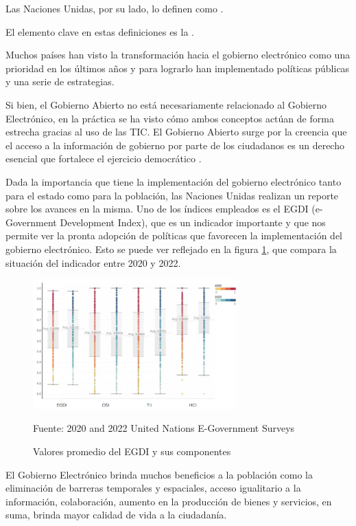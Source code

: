 Las Naciones Unidas, por su lado, lo definen como .

El elemento clave en estas definiciones es la .

Muchos países han visto la transformación hacia el gobierno electrónico como una prioridad en los últimos años y para lograrlo han implementado políticas públicas y una serie de estrategias.

Si bien, el Gobierno Abierto no está necesariamente relacionado al Gobierno Electrónico, en la práctica se ha visto cómo ambos conceptos actúan de forma estrecha gracias al uso de las TIC. El Gobierno Abierto surge por la creencia que el acceso a la información de gobierno por parte de los ciudadanos es un derecho esencial que fortalece el ejercicio democrático \cite[13]{naserGobiernoElectronicoGestion2011}.

Dada la importancia que tiene la implementación del gobierno electrónico tanto para el estado como para la población, las Naciones Unidas realizan un reporte sobre los avances en la misma. Uno de los índices empleados es el EGDI (e-Government Development Index), que es un indicador importante y que nos permite ver la pronta adopción de políticas que favorecen la implementación del gobierno electrónico. Esto se puede ver reflejado en la figura \ref{fig:egdi2020_2022}, que compara la situación del indicador entre 2020 y 2022.

\begin{figure}[!h]
    \centering
    \includegraphics[width=0.7\textwidth]{assets/egdi2020_2022}
    \caption{Valores promedio del EGDI y sus componentes}{Fuente: 2020 and 2022 United Nations E-Government Surveys}
    \label{fig:egdi2020_2022}
\end{figure}

El Gobierno Electrónico brinda muchos beneficios a la población como la eliminación de barreras temporales y espaciales, acceso igualitario a la información, colaboración, aumento en la producción de bienes y servicios, en suma, brinda mayor calidad de vida a la ciudadanía.

